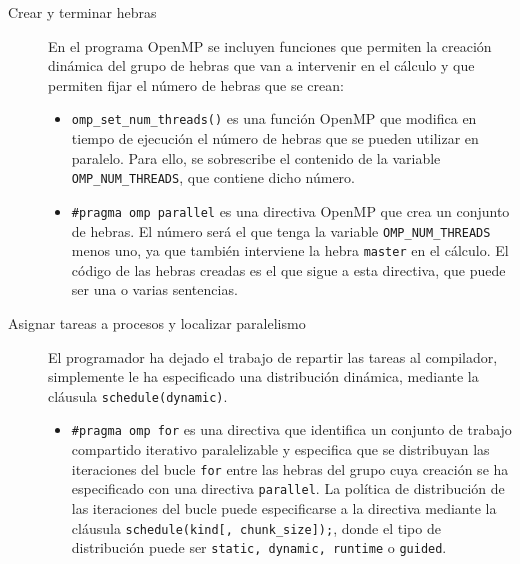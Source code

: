\begin{description}
    \item [Crear y terminar hebras] En el programa OpenMP se incluyen funciones que permiten la creación dinámica del grupo de hebras que van a intervenir en el cálculo y que permiten fijar el número de hebras que se crean:
        \begin{itemize}
            \item \verb|omp_set_num_threads()| es una función OpenMP que modifica en tiempo de ejecución el número de hebras que se pueden utilizar en paralelo. Para ello, se sobrescribe el contenido de la variable \verb|OMP_NUM_THREADS|, que contiene dicho número.
            \item \verb|#pragma omp parallel| es una directiva OpenMP que crea un conjunto de hebras. El número será el que tenga la variable \verb|OMP_NUM_THREADS| menos uno, ya que también interviene la hebra \verb|master| en el cálculo. El código de las hebras creadas es el que sigue a esta directiva, que puede ser una o varias sentencias.
        \end{itemize}
    \item [Asignar tareas a procesos y localizar paralelismo] El programador ha dejado el trabajo de repartir las tareas al compilador, simplemente le ha especificado una distribución dinámica, mediante la cláusula \verb|schedule(dynamic)|.
        \begin{itemize}
            \item \verb|#pragma omp for| es una directiva que identifica un conjunto de trabajo compartido iterativo paralelizable y especifica que se distribuyan las iteraciones del bucle \verb|for| entre las hebras del grupo cuya creación se ha especificado con una directiva \verb|parallel|. La política de distribución de las iteraciones del bucle puede especificarse a la directiva mediante la cláusula \verb|schedule(kind[, chunk_size]);|, donde el tipo de distribución puede ser \verb|static, dynamic, runtime| o \verb|guided|.


\end{itemize}
\end{description}

